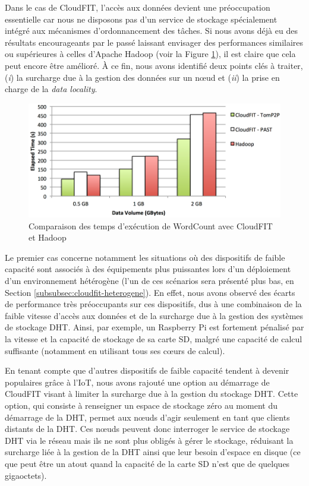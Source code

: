 Dans le cas de CloudFIT, l'accès aux données devient une préoccupation essentielle car nous ne disposons pas d'un service de stockage spécialement intégré aux mécanismes d'ordonnancement des tâches. Si nous avons déjà eu des résultats encourageants par le passé \cite{Steffenel2015Roma} laissant envisager des performances similaires ou supérieures à celles d’Apache Hadoop (voir la Figure \ref{fig:Hadoop}), il est claire que cela peut encore être amélioré. À ce fin, nous avons identifié deux points clés à traiter, (\textit{i}) la surcharge due à la gestion des données sur un n{\oe}ud et (\textit{ii}) la prise en charge de la \textit{data locality}. 

\begin{figure}[!ht]
	\centering
	\includegraphics[width=0.65\linewidth]{img/CloudFIT-mesures.pdf}
	\caption{Comparaison des temps d'exécution de WordCount avec CloudFIT et Hadoop}
	\label{fig:Hadoop}
\end{figure}

Le premier cas concerne notamment les situations où des dispositifs de faible capacité sont associés à des équipements plus puissantes lors d'un déploiement d'un environnement hétérogène (l'un de ces scénarios sera présenté plus bas, en Section \ref{subsubsec:cloudfit-heterogene}). En effet, nous avons observé des écarts de performance très préoccupants sur ces dispositifs, dus à une combinaison de la faible vitesse d'accès aux données et de la surcharge due à la gestion des systèmes de stockage DHT. Ainsi, par exemple, un Raspberry Pi est fortement pénalisé par la vitesse et la capacité de stockage de sa carte SD, malgré une capacité de calcul suffisante (notamment en utilisant tous ses c{\oe}urs de calcul). 

En tenant compte que d'autres dispositifs de faible capacité tendent à devenir populaires grâce à l'IoT, nous avons rajouté une option au démarrage de CloudFIT visant à limiter la surcharge due à la gestion du stockage DHT. Cette option, qui consiste à renseigner un espace de stockage zéro au moment du démarrage de la DHT, permet aux n{\oe}uds d'agir seulement en tant que clients distants de la DHT. Ces n{\oe}uds peuvent donc interroger le service de stockage DHT via le réseau mais ils ne sont plus obligés à gérer le stockage, réduisant la surcharge liée à la gestion de la DHT ainsi que leur besoin d'espace en disque (ce que peut être un atout quand la capacité de la carte SD n'est que de quelques gigaoctets).

